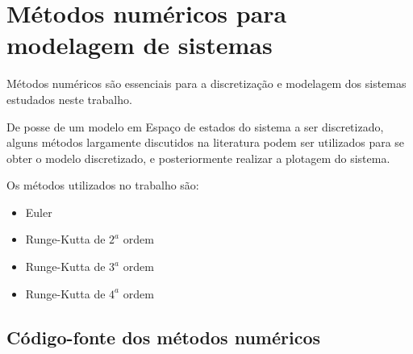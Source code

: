 \chapter{Métodos numéricos para modelagem de sistemas}

    Métodos numéricos são essenciais para a discretização e modelagem
    dos sistemas estudados neste trabalho.
    
    De posse de um modelo em Espaço de estados do sistema a ser discretizado,
    alguns métodos largamente discutidos na literatura podem ser utilizados
    para se obter o modelo discretizado, e posteriormente realizar a plotagem
    do sistema.
    
    Os métodos utilizados no trabalho são:
    
    \begin{itemize}
        \item Euler
        \item Runge-Kutta de $2^a$ ordem
        \item Runge-Kutta de $3^a$ ordem
        \item Runge-Kutta de $4^a$ ordem
    \end{itemize}
    

\section{Código-fonte dos métodos numéricos}
    
